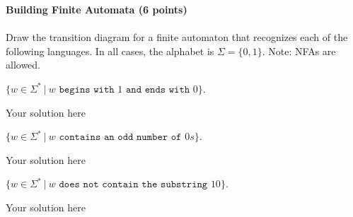 \documentclass[12pt]{article}
\newenvironment{question}[2][Question]{\begin{trivlist}
\item[\hskip \labelsep {\bfseries #1}\hskip \labelsep {\bfseries #2.}]}{\end{trivlist}}
\newenvironment{solution}[1][Solution:]{\begin{trivlist}
\item[\hskip \labelsep {\bfseries #1}\hskip \labelsep {\bfseries}]\color{blue}}{\end{trivlist}}
\begin{document}
\clearpage
\begin{question}{6}\textbf{Building Finite Automata (6 points)}\\\\

Draw the transition diagram for a finite automaton that recognizes each of the following languages. In all cases, the alphabet is $\Sigma = \{0,1\}$.
Note: NFAs are allowed.
\begin{enumerate}[(a)]
	\item $\{ w \in \Sigma^* \ | \ w \texttt{ begins with } 1 \texttt{ and ends with } 0 \}$.
\begin{solution}
\;

Your solution here


\end{solution}

	\item $\{ w \in \Sigma^* \ | \ w \texttt{ contains an odd number of } 0s \}$.
\begin{solution}
\;

Your solution here
\end{solution}

	\item $\{ w \in \Sigma^* \ | \ w \texttt{ does not contain the substring } 10 \}$.
\begin{solution}
\;

Your solution here
\end{solution}

\end{enumerate}
\end{question}
\end{document}

